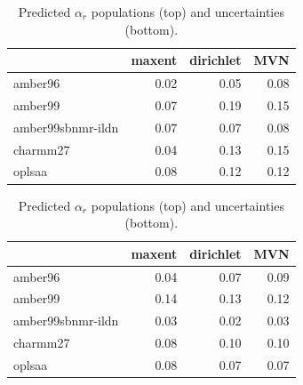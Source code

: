 \documentclass[12pt]{article}
\begin{document}
\begin{table}

\begin{tabular}{lrrr}
\toprule
{} &  maxent &  dirichlet &  MVN \\
\midrule
amber96           &    0.02 &       0.05 & 0.08 \\
amber99           &    0.07 &       0.19 & 0.15 \\
amber99sbnmr-ildn &    0.07 &       0.07 & 0.08 \\
charmm27          &    0.04 &       0.13 & 0.15 \\
oplsaa            &    0.08 &       0.12 & 0.12 \\
\bottomrule
\end{tabular}

\begin{tabular}{lrrr}
\toprule
{} &  maxent &  dirichlet &  MVN \\
\midrule
amber96           &    0.04 &       0.07 & 0.09 \\
amber99           &    0.14 &       0.13 & 0.12 \\
amber99sbnmr-ildn &    0.03 &       0.02 & 0.03 \\
charmm27          &    0.08 &       0.10 & 0.10 \\
oplsaa            &    0.08 &       0.07 & 0.07 \\
\bottomrule
\end{tabular}

\caption{
Predicted $\alpha_r$ populations (top) and uncertainties (bottom).  
}
\end{table}

\clearpage
\end{document}
